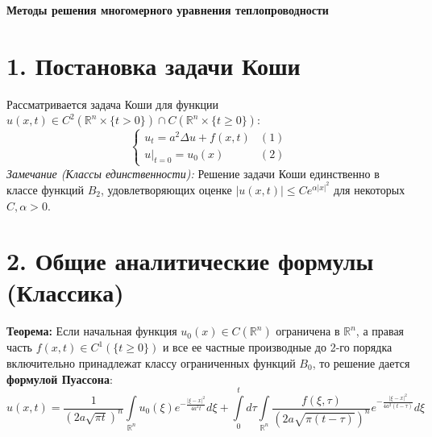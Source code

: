 \usepackage[T2A]{fontenc}
\usepackage[utf8]{inputenc}
\usepackage[russian]{babel}

\usepackage{amsmath, amsfonts, amssymb, amsthm}
\usepackage{geometry}
\usepackage{titlesec}

\geometry{left=1cm, right=1cm, top=1.5cm, bottom=1.5cm}

\titleformat{\section}{\large\bfseries}{}{0em}{}
\titleformat{\subsection}{\normalsize\bfseries}{}{0em}{}



\begin{center}
    \LARGE \textbf{Методы решения многомерного уравнения теплопроводности}
\end{center}

\section{1. Постановка задачи Коши}
Рассматривается задача Коши для функции $u(x, t) \in C^2(\mathbb{R}^n \times \{t > 0\}) \cap C(\mathbb{R}^n \times \{t \ge 0\})$:
\[
\begin{cases}
u_t = a^2 \Delta u + f(x,t) & (1) \\
u|_{t=0} = u_0(x) & (2)
\end{cases}
\]
\textit{Замечание (Классы единственности):} Решение задачи Коши единственно в классе функций $B_2$, удовлетворяющих оценке $|u(x,t)| \le C e^{\alpha|x|^2}$ для некоторых $C, \alpha > 0$.

\section{2. Общие аналитические формулы (Классика)}
\textbf{Теорема:} Если начальная функция $u_0(x) \in C(\mathbb{R}^n)$ ограничена в $\mathbb{R}^n$, а правая часть $f(x,t) \in C^1(\{t \ge 0\})$ и все ее частные производные до 2-го порядка включительно принадлежат классу ограниченных функций $B_0$, то решение дается \textbf{формулой Пуассона}:
\[ 
u(x,t) = \frac{1}{(2a\sqrt{\pi t})^n} \int\limits_{\mathbb{R}^n} u_0(\xi) e^{-\frac{|\xi-x|^2}{4a^2t}} d\xi + \int\limits_0^t d\tau \int\limits_{\mathbb{R}^n} \frac{f(\xi, \tau)}{(2a\sqrt{\pi(t-\tau)})^n} e^{-\frac{|\xi-x|^2}{4a^2(t-\tau)}} d\xi 
\]

